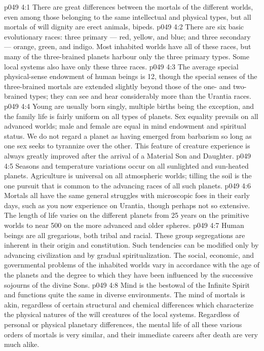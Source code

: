 \vs p049 4:1 There are great differences between the mortals of the different worlds, even among those belonging to the same intellectual and physical types, but all mortals of will dignity are erect animals, bipeds.
\vs p049 4:2 There are six basic evolutionary races: three primary --- red, yellow, and blue; and three secondary --- orange, green, and indigo. Most inhabited worlds have all of these races, but many of the three\hyp{}brained planets harbour only the three primary types. Some local systems also have only these three races.
\vs p049 4:3 The average special physical\hyp{}sense endowment of human beings is 12, though the special senses of the three\hyp{}brained mortals are extended slightly beyond those of the one\hyp{} and two\hyp{}brained types; they can see and hear considerably more than the Urantia races.
\vs p049 4:4 Young are usually born singly, multiple births being the exception, and the family life is fairly uniform on all types of planets. Sex equality prevails on all advanced worlds; male and female are equal in mind endowment and spiritual status. We do not regard a planet as having emerged from barbarism so long as one sex seeks to tyrannize over the other. This feature of creature experience is always greatly improved after the arrival of a Material Son and Daughter.
\vs p049 4:5 \pc Seasons and temperature variations occur on all sunlighted and sun\hyp{}heated planets. Agriculture is universal on all atmospheric worlds; tilling the soil is the one pursuit that is common to the advancing races of all such planets.
\vs p049 4:6 Mortals all have the same general struggles with microscopic foes in their early days, such as you now experience on Urantia, though perhaps not so extensive. The length of life varies on the different planets from 25 years on the primitive worlds to near 500 on the more advanced and older spheres.
\vs p049 4:7 Human beings are all gregarious, both tribal and racial. These group segregations are inherent in their origin and constitution. Such tendencies can be modified only by advancing civilization and by gradual spiritualization. The social, economic, and governmental problems of the inhabited worlds vary in accordance with the age of the planets and the degree to which they have been influenced by the successive sojourns of the divine Sons.
\vs p049 4:8 \pc Mind is the bestowal of the Infinite Spirit and functions quite the same in diverse environments. The mind of mortals is akin, regardless of certain structural and chemical differences which characterize the physical natures of the will creatures of the local systems. Regardless of personal or physical planetary differences, the mental life of all these various orders of mortals is very similar, and their immediate careers after death are very much alike.
